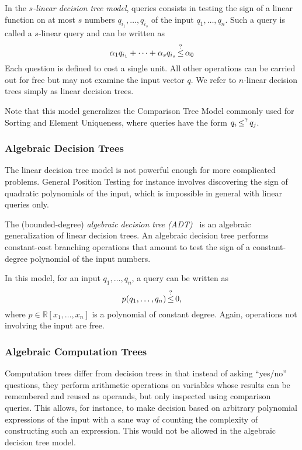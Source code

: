 In the \emph{\(s\)-linear decision tree model}, queries consists
in testing the sign of a linear function on at most \(s\) numbers \(q_{i_1},\ldots,q_{i_s}\) of the
input \(q_1,\ldots,q_n\). Such a query is called a \(s\)-linear query and
can be written as
%
\begin{displaymath}
	\alpha_1 q_{i_1} + \cdots + \alpha_s q_{i_s} \mathop{\leq}^{?} \alpha_0
\end{displaymath}
%
Each question is defined to cost a single unit. All other operations can be
carried out for free but may not examine the input vector $q$. We refer to
$n$-linear decision trees simply as linear decision trees.

Note that this model generalizes the Comparison Tree Model commonly used for
Sorting and Element Uniqueness, where queries have the form \(q_i \mathop{\leq}^{?}
q_j\).

\subsubsection{Algebraic Decision Trees}
The linear decision tree model is not powerful enough for more complicated
problems. General Position Testing for instance involves discovering the sign
of quadratic polynomials of the input, which is impossible in general with
linear queries only.

The (bounded-degree) \emph{algebraic decision tree (ADT)}~\cite{R72,Y81,SY82}
is an algebraic generalization of linear decision trees.
An algebraic decision tree performs constant-cost branching operations that
amount to test the sign of
a constant-degree polynomial of the input numbers.

In this model, for an input \(q_1,\ldots,q_n\), a query can be written as
\begin{displaymath}
	p(q_1, \ldots, q_n) \mathop{\le}^{?} 0,
\end{displaymath}
where \(p \in \mathbb{R}[x_1,\ldots, x_n]\) is a polynomial of constant
degree. Again, operations not involving the input are free.

\subsubsection{Algebraic Computation Trees}
Computation trees differ from decision trees in that instead of asking
``yes/no'' questions, they perform arithmetic operations on variables whose
results can be remembered and reused as operands, but only inspected using
comparison queries. This allows, for instance, to make decision based on
arbitrary polynomial expressions of the input with a sane way of counting the
complexity of constructing such an expression. This would not be allowed in
the algebraic decision tree model.

